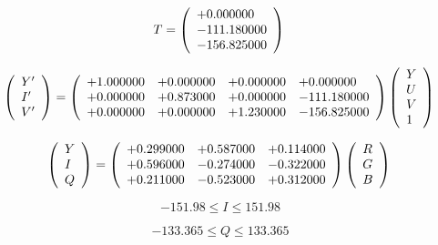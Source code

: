 \documentclass{article}
\begin{document}
\[ T = \left( \begin{array}{l} +0.000000 \\ -111.180000 \\ -156.825000 \\ \end{array} \right) \\ \]
\pagebreak

\[ \left( \begin{array}{l} Y' \\ I' \\ V' \\ \end{array} \right) = \left( \begin{array}{llll} +1.000000 & +0.000000 & +0.000000 & +0.000000 \\ +0.000000 & +0.873000 & +0.000000 & -111.180000 \\ +0.000000 & +0.000000 & +1.230000 & -156.825000 \\ \end{array} \right) \left( \begin{array}{l} Y \\ U \\ V \\ 1 \\ \end{array} \right) \\ \]
\pagebreak

\[ \left( \begin{array}{l} Y \\ I \\ Q \\ \end{array} \right) = \left( \begin{array}{lll} +0.299000 & +0.587000 & +0.114000 \\ +0.596000 & -0.274000 & -0.322000 \\ +0.211000 & -0.523000 & +0.312000 \\ \end{array} \right) \left( \begin{array}{l} R \\ G \\ B \\ \end{array} \right) \\ \]
\pagebreak

\[ -151.98 \le I \le 151.98 \]
\pagebreak

\[ -133.365 \le Q \le 133.365 \]
\pagebreak
\end{document}
